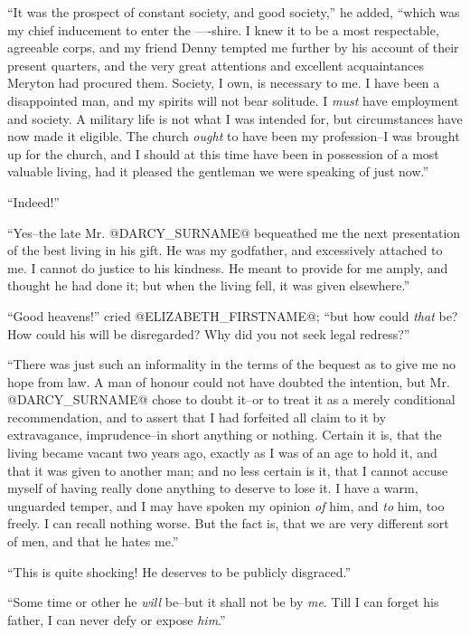 ``It was the prospect of constant society, and good society,'' he added,
``which was my chief inducement to enter the ----shire. I knew it to be
a most respectable, agreeable corps, and my friend Denny tempted me
further by his account of their present quarters, and the very great
attentions and excellent acquaintances Meryton had procured them.
Society, I own, is necessary to me. I have been a disappointed man, and
my spirits will not bear solitude. I \textit{must} have employment and society.
A military life is not what I was intended for, but circumstances have
now made it eligible. The church \textit{ought} to have been my profession--I
was brought up for the church, and I should at this time have been in
possession of a most valuable living, had it pleased the gentleman we
were speaking of just now.''

``Indeed!''

``Yes--the late Mr. @DARCY_SURNAME@ bequeathed me the next presentation of the best
living in his gift. He was my godfather, and excessively attached to me.
I cannot do justice to his kindness. He meant to provide for me amply,
and thought he had done it; but when the living fell, it was given
elsewhere.''

``Good heavens!'' cried @ELIZABETH_FIRSTNAME@; ``but how could \textit{that} be? How could his
will be disregarded? Why did you not seek legal redress?''

``There was just such an informality in the terms of the bequest as to
give me no hope from law. A man of honour could not have doubted the
intention, but Mr. @DARCY_SURNAME@ chose to doubt it--or to treat it as a merely
conditional recommendation, and to assert that I had forfeited all claim
to it by extravagance, imprudence--in short anything or nothing. Certain
it is, that the living became vacant two years ago, exactly as I was
of an age to hold it, and that it was given to another man; and no
less certain is it, that I cannot accuse myself of having really done
anything to deserve to lose it. I have a warm, unguarded temper, and
I may have spoken my opinion \textit{of} him, and \textit{to} him, too freely. I can
recall nothing worse. But the fact is, that we are very different sort
of men, and that he hates me.''

``This is quite shocking! He deserves to be publicly disgraced.''

``Some time or other he \textit{will} be--but it shall not be by \textit{me}. Till I
can forget his father, I can never defy or expose \textit{him}.''

